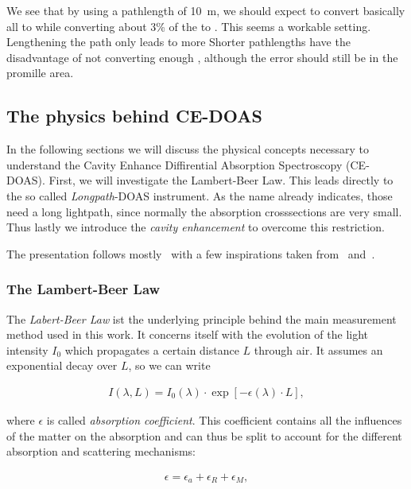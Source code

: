 We see that by using a pathlength of \SI{10}{\meter}, we should expect
to convert basically all  to  while converting about
3\% of the  to . This seems a workable
setting. Lengthening the path only leads to more  Shorter
pathlengths have the disadvantage of not converting enough ,
although the error should still be in the promille area.

\subsection{The physics behind CE-DOAS}
\label{sec:ce-doas-physics}

In the following sections we will discuss the physical concepts
necessary to understand the Cavity Enhance Diffirential Absorption
Spectroscopy (CE-DOAS). First, we will investigate the Lambert-Beer
Law. This leads directly to the so called \emph{Longpath}-DOAS
instrument. As the name already indicates, those need a long
lightpath, since normally the absorption crosssections are very
small. Thus lastly we introduce the \emph{cavity enhancement} to
overcome this restriction.

The presentation follows mostly~\cite{fp58} with a few inspirations
taken from~\cite{bsc} and~\cite{platt2008differential}.

\subsubsection{The Lambert-Beer Law}
\label{sec:lambert-beer}

The \emph{Labert-Beer Law} ist the underlying principle behind the
main measurement method used in this work. It concerns itself with the
evolution of the light intensity $I_0$ which propagates a certain
distance $L$ through air. It assumes an exponential decay over $L$, so
we can write

\begin{align}
  I(\lambda, L) = I_0(\lambda) \cdot \exp[-\epsilon(\lambda) \cdot
  L], \label{eq:lb-easy}
\end{align}

where $\epsilon$ is called \emph{absorption coefficient}. This
coefficient contains all the influences of the matter on the
absorption and can thus be split to account for the different
absorption and scattering mechanisms:

\begin{align*}
  \epsilon = \epsilon_a + \epsilon_R + \epsilon_M,
\end{align*}

